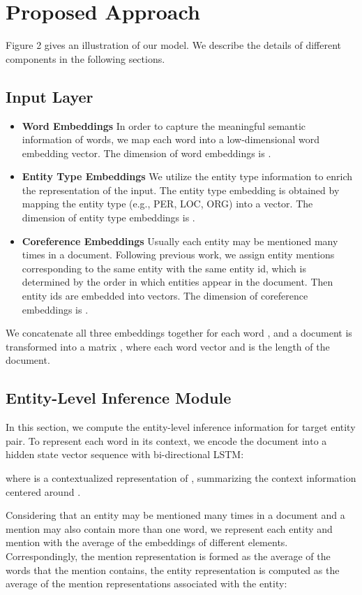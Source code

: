 \documentclass[runningheads]{llncs}
\begin{document}
\section{Proposed Approach}
Figure 2 gives an illustration of our model.
We describe the details of different components in the following sections. 

\subsection{Input Layer}
\begin{itemize}
	\item 
	\textbf{Word Embeddings}
	In order to capture the meaningful semantic information of words, we map each word into a low-dimensional word embedding vector. 
	The dimension of word embeddings is .
	
	\item 
	\textbf{Entity Type Embeddings}
We utilize the entity type information to enrich the representation of the input.
	The entity type embedding is obtained by mapping the entity type (e.g., PER, LOC, ORG) into a vector. 
	The dimension of entity type embeddings is .
	
	\item 
	\textbf{Coreference Embeddings}
	Usually each entity may be mentioned many times in a document.
	Following previous work, we assign entity mentions corresponding to the same entity with the same entity id, which is determined by the order in which entities appear in the document.
	Then entity ids are embedded into vectors. 
	The dimension of coreference embeddings is .
\end{itemize}

We concatenate all three embeddings together for each word , and a document is transformed into a matrix , 
where each word vector  and  is the length of the document.

\subsection{Entity-Level Inference Module}
In this section, we compute the entity-level inference information for target entity pair.
To represent each word in its context, we encode the document  
into a hidden state vector sequence  with bi-directional LSTM:

where  is a contextualized representation of , summarizing the context information centered around . 

Considering that an entity may be mentioned many times in a document and a mention may also contain more than one word, we represent each entity and mention with the average of the embeddings of different elements.
Correspondingly, the mention representation is formed as the average of the words that the mention contains, the entity representation is computed as the average of the mention representations associated with the entity:
\end{document}
